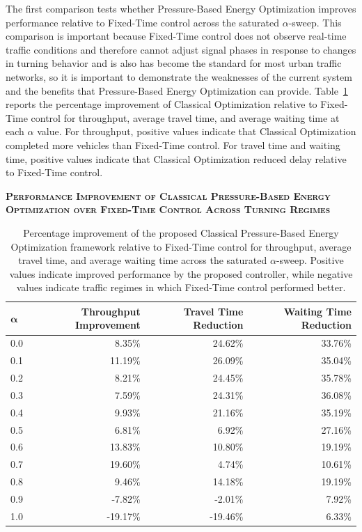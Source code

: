 \documentclass[12pt]{article}
\begin{document}
The first comparison tests whether Pressure-Based Energy Optimization improves performance relative to Fixed-Time control across the saturated $\alpha$-sweep. This comparison is important because Fixed-Time control does not observe real-time traffic conditions and therefore cannot adjust signal phases in response to changes in turning behavior and is also has become the standard for most urban traffic networks, so it is important to demonstrate the weaknesses of the current system and the benefits that Pressure-Based Energy Optimization can provide. Table~\ref{tab:fixed-vs-classical-percent-table} reports the percentage improvement of Classical Optimization relative to Fixed-Time control for throughput, average travel time, and average waiting time at each $\alpha$ value. For throughput, positive values indicate that Classical Optimization completed more vehicles than Fixed-Time control. For travel time and waiting time, positive values indicate that Classical Optimization reduced delay relative to Fixed-Time control.
\begin{table}[H]
\centering
\textbf{\textsc{Performance Improvement of Classical Pressure-Based Energy Optimization over Fixed-Time Control Across Turning Regimes}}

\vspace{0.3cm}

\begin{tabular}{@{} l r r r @{}}
\toprule
$\boldsymbol{\alpha}$ & \textbf{Throughput Improvement} & \textbf{Travel Time Reduction} & \textbf{Waiting Time Reduction} \\
\midrule
0.0 & 8.35\%  & 24.62\%  & 33.76\% \\
0.1 & 11.19\% & 26.09\%  & 35.04\% \\
0.2 & 8.21\%  & 24.45\%  & 35.78\% \\
0.3 & 7.59\%  & 24.31\%  & 36.08\% \\
0.4 & 9.93\%  & 21.16\%  & 35.19\% \\
0.5 & 6.81\%  & 6.92\%   & 27.16\% \\
0.6 & 13.83\% & 10.80\%  & 19.19\% \\
0.7 & 19.60\% & 4.74\%   & 10.61\% \\
0.8 & 9.46\%  & 14.18\%  & 19.19\% \\
0.9 & -7.82\% & -2.01\%  & 7.92\% \\
1.0 & -19.17\% & -19.46\% & 6.33\% \\
\bottomrule
\end{tabular}

\caption{Percentage improvement of the proposed Classical Pressure-Based Energy Optimization framework relative to Fixed-Time control for throughput, average travel time, and average waiting time across the saturated $\alpha$-sweep. Positive values indicate improved performance by the proposed controller, while negative values indicate traffic regimes in which Fixed-Time control performed better.}
\label{tab:fixed-vs-classical-percent-table}
\end{table}
\end{document}
